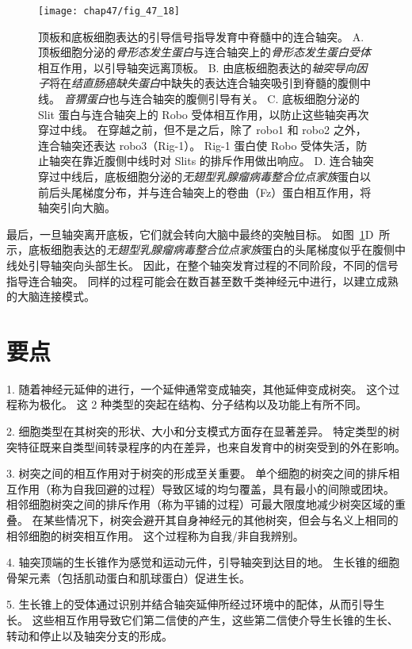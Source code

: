 \begin{figure}[htbp]
	\centering
	\texttt{[image: chap47/fig\_47\_18]}
	\caption{顶板和底板细胞表达的引导信号指导发育中脊髓中的连合轴突。
		A. 顶板细胞分泌的\textit{骨形态发生蛋白}与连合轴突上的\textit{骨形态发生蛋白受体}相互作用，以引导轴突远离顶板。
		B. 由底板细胞表达的\textit{轴突导向因子}将在\textit{结直肠癌缺失蛋白}中缺失的表达连合轴突吸引到脊髓的腹侧中线。
		\textit{音猬蛋白}也与连合轴突的腹侧引导有关。
		C. 底板细胞分泌的 Slit 蛋白与连合轴突上的 Robo 受体相互作用，以防止这些轴突再次穿过中线。
		在穿越之前，但不是之后，除了 robo1 和 robo2 之外，连合轴突还表达 robo3（Rig-1）。
		Rig-1 蛋白使 Robo 受体失活，防止轴突在靠近腹侧中线时对 Slits 的排斥作用做出响应。
		D. 连合轴突穿过中线后，底板细胞分泌的\textit{无翅型乳腺瘤病毒整合位点家族}蛋白以前后头尾梯度分布，并与连合轴突上的卷曲（Fz）蛋白相互作用，将轴突引向大脑。}
	\label{fig:47_18}
\end{figure}


最后，一旦轴突离开底板，它们就会转向大脑中最终的突触目标。
如图~\ref{fig:47_18}D~所示，底板细胞表达的\textit{无翅型乳腺瘤病毒整合位点家族}蛋白的头尾梯度似乎在腹侧中线处引导轴突向头部生长。
因此，在整个轴突发育过程的不同阶段，不同的信号指导连合轴突。
同样的过程可能会在数百甚至数千类神经元中进行，以建立成熟的大脑连接模式。



\section{要点}

1. 随着神经元延伸的进行，一个延伸通常变成轴突，其他延伸变成树突。
这个过程称为极化。
这 2 种类型的突起在结构、分子结构以及功能上有所不同。


2. 细胞类型在其树突的形状、大小和分支模式方面存在显著差异。
特定类型的树突特征既来自类型间转录程序的内在差异，也来自发育中的树突受到的外在影响。


3. 树突之间的相互作用对于树突的形成至关重要。
单个细胞的树突之间的排斥相互作用（称为自我回避的过程）导致区域的均匀覆盖，具有最小的间隙或团块。
相邻细胞树突之间的排斥作用（称为平铺的过程）可最大限度地减少树突区域的重叠。
在某些情况下，树突会避开其自身神经元的其他树突，但会与名义上相同的相邻细胞的树突相互作用。
这个过程称为自我/非自我辨别。


4. 轴突顶端的生长锥作为感觉和运动元件，引导轴突到达目的地。
生长锥的细胞骨架元素（包括肌动蛋白和肌球蛋白）促进生长。


5. 生长锥上的受体通过识别并结合轴突延伸所经过环境中的配体，从而引导生长。
这些相互作用导致它们第二信使的产生，这些第二信使介导生长锥的生长、转动和停止以及轴突分支的形成。



